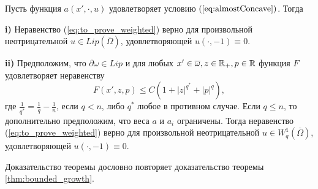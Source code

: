 \begin{thm}
Пусть функция $a(x', \cdot, u)$ удовлетворяет условию $(\ref{eq:almostConcave})$.
Тогда

\textbf{\textup{i)}} Неравенство (\ref{eq:to_prove_weighted}) верно для произвольной неотрицательной $u \in Lip(\overline{\Omega})$,
удовлетворяющей $u(\cdot, -1) \equiv 0$.

\textbf{\textup{ii)}} Предположим, что $\partial \omega \in Lip$ и
для любых $x' \in \overline{\omega}, z \in \Real_+, p \in \Real$
функция $F$ удовлетворяет неравенству
$$F( x', z, p ) \le C ( 1 + |z|^{q^*} + |p|^q ),$$
где $\frac{1}{q^*} = \frac{1}{q} - \frac{1}{n}$, если $q < n$, либо $q^*$ любое в противном случае.
Если $q \le n$, то дополнительно предположим, что веса $a$ и $a_i$ ограничены.
Тогда неравенство (\ref{eq:to_prove_weighted}) верно для произвольной неотрицательной $u \in W^1_q(\overline{\Omega})$,
удовлетворяющей $u(\cdot, -1) \equiv 0$.
\end{thm}

Доказательство теоремы дословно повторяет доказательство теоремы \ref{thm:bounded_growth}.

